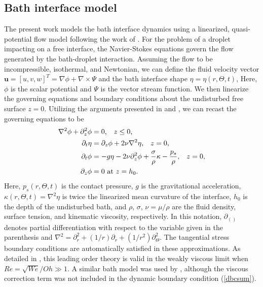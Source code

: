 \documentclass{jfm}
\begin{document}
\subsection{Bath interface model}
The present work models the bath interface dynamics using a linearized, quasi-potential flow model following the work of \cite{galeano2017non}. For the problem of a droplet impacting on a free interface, the Navier-Stokes equations govern the flow generated by the bath-droplet interaction. Assuming the flow to be incompressible, isothermal, and Newtonian, we can define the fluid velocity vector $\textbf{u} = [u,v,w]^T= \nabla \phi + \nabla \times \Psi$ and the bath interface shape $\eta =\eta(r,\Theta,t)$,  Here, $\phi$ is the scalar potential and $\Psi$ is the vector stream function. We then linearize the governing equations and boundary conditions about the undisturbed free surface $z=0$. Utilizing the arguments presented in \cite{galeano2017non} and \cite{dias2008theory}, we can recast the governing equations to be
\begin{align}
    \nabla^2 \phi + \partial_z^2 \phi &= 0 \text{,\hspace*{1em}} z \leq 0 \text{,} \label{potential}\\
    \partial_t \eta  &= \partial_z \phi + 2 \nu \nabla^2 \eta \text{,\hspace*{1em}} z = 0 \text{,} \label{kbcsum}\\
    \partial_t \phi &= - g\eta -2\nu \partial_z^2 \phi + \frac{\sigma}{\rho}\kappa - \frac{p_s}{\rho} \text{,\hspace*{1em}} z = 0 \text{,} \label{dbcsum}\\
    \partial_z \phi &=  0 \text{ at } z=h_0 \text{.} \label{final_equations}
\end{align} Here, $p_s(r,\Theta,t)$ is the contact pressure, $g$ is the gravitational acceleration, $\kappa(r,\Theta,t)=\nabla^2 \eta$ is twice the linearized mean curvature of the interface, $h_0$ is the depth of the undisturbed bath, and $\rho$, $\sigma$, $\nu = \mu/\rho$ are the fluid density, surface tension, and kinematic viscosity, respectively. 
In this notation, $\partial_{( )}$ denotes partial differentiation with respect to the variable given in the parenthesis and $\nabla^2 = \partial_{r}^2 + (1/r)\partial_r + (1/r^2)\partial_{\Theta}^2$. The tangential stress boundary conditions are automatically satisfied in these approximations.  As detailed in \cite{galeano2017non}, this leading order theory is valid in the weakly viscous limit when $Re=\sqrt{We}/Oh \gg 1$.  A similar bath model was used by \cite{blanchette2016modeling,blanchette2017octahedra}, although the viscous correction term was not included in the dynamic boundary condition (\ref{dbcsum}).\\
\end{document}

